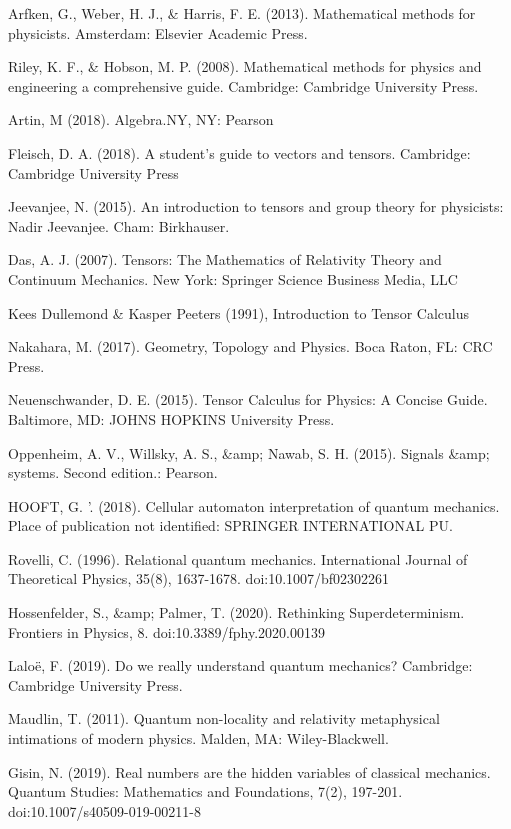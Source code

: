 \documentclass[a4paper,12pt]{book}
\begin{document}
\begin{thebibliography}{9}
	  Arfken, G., Weber, H. J., \& Harris, F. E. (2013). Mathematical methods for physicists. Amsterdam: Elsevier Academic Press.
	
	 Riley, K. F., \& Hobson, M. P. (2008). Mathematical methods for physics and engineering a comprehensive guide. Cambridge: Cambridge University Press.
	
	 Artin, M (2018). Algebra.NY, NY: Pearson
	
	 Fleisch, D. A. (2018). A student's guide to vectors and tensors. Cambridge: Cambridge University Press
	
	 Jeevanjee, N. (2015). An introduction to tensors and group theory for physicists: Nadir Jeevanjee. Cham: Birkhauser.
	
	 Das, A. J. (2007). Tensors: The Mathematics of Relativity Theory and Continuum Mechanics. New York: Springer Science Business Media, LLC
	
	  Kees Dullemond \& Kasper Peeters (1991), Introduction to Tensor Calculus 
		
	 Nakahara, M. (2017). Geometry, Topology and Physics. Boca Raton, FL: CRC Press.
	
	 Neuenschwander, D. E. (2015). Tensor Calculus for Physics: A Concise Guide. Baltimore, MD: JOHNS HOPKINS University Press.
	
	  Oppenheim, A. V., Willsky, A. S., \&amp; Nawab, S. H. (2015). Signals \&amp; systems. Second edition.: Pearson.
	
	 HOOFT, G. '. (2018). Cellular automaton interpretation of quantum mechanics. Place of publication not
	 identified: SPRINGER INTERNATIONAL PU.
	 
	  Rovelli, C. (1996). Relational quantum mechanics. International Journal of Theoretical Physics, 35(8), 1637-1678. doi:10.1007/bf02302261
	 
	  Hossenfelder, S., \&amp; Palmer, T. (2020). Rethinking Superdeterminism. Frontiers in Physics, 8. doi:10.3389/fphy.2020.00139
	 
	  Laloë, F. (2019). Do we really understand quantum mechanics? Cambridge: Cambridge University Press.
	 
	  Maudlin, T. (2011). Quantum non-locality and relativity metaphysical intimations of modern physics. Malden, MA: Wiley-Blackwell.
	 
	  Gisin, N. (2019). Real numbers are the hidden variables of classical mechanics. Quantum Studies: Mathematics and Foundations, 7(2), 197-201. doi:10.1007/s40509-019-00211-8
	 

\end{thebibliography}
\end{document}

